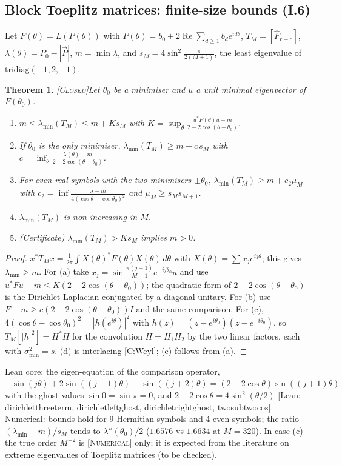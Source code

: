 \documentclass[11pt]{amsart}
\theoremstyle{plain}
\newtheorem{theorem}{Theorem}[section]
\theoremstyle{definition}
\newcommand{\status}[1]{\textsc{[#1]}}
\newcommand{\leanus}{\textunderscore\allowbreak}
\newcommand{\lean}[1]{{\ttfamily\let\_\leanus #1}}
\begin{document}
\subsection{Block Toeplitz matrices: finite-size bounds (I.6)}
Let $F(\theta)=L(P(\theta))$ with $P(\theta)=b_0+2\operatorname{Re}\sum_{d\ge1}b_de^{id\theta}$,
$T_M=[\hat F_{r-c}]$, $\lambda(\theta)=P_0-|\vec P|$, $m=\min\lambda$, and
$s_M=4\sin^2\frac{\pi}{2(M+1)}$, the least eigenvalue of
$\mathrm{tridiag}(-1,2,-1)$.
\begin{theorem}\status{Closed}\label{thm:toeplitz}
Let $\theta_0$ be a minimiser and $u$ a unit minimal eigenvector of $F(\theta_0)$.
\begin{enumerate}[label=(\alph*)]
\item $m\le\lambda_{\min}(T_M)\le m+K s_M$ with
$K=\sup_\theta\frac{u^*F(\theta)u-m}{2-2\cos(\theta-\theta_0)}$.
\item If $\theta_0$ is the only minimiser, $\lambda_{\min}(T_M)\ge m+c\,s_M$ with
$c=\inf_\theta\frac{\lambda(\theta)-m}{2-2\cos(\theta-\theta_0)}$.
\item For even real symbols with the two minimisers $\pm\theta_0$,
$\lambda_{\min}(T_M)\ge m+c_2\mu_M$ with $c_2=\inf\frac{\lambda-m}{4(\cos\theta-\cos\theta_0)^2}$
and $\mu_M\ge s_Ms_{M+1}$.
\item $\lambda_{\min}(T_M)$ is non-increasing in $M$.
\item (Certificate) $\lambda_{\min}(T_M)>Ks_M$ implies $m>0$.
\end{enumerate}
\end{theorem}
\begin{proof}
$x^*T_Mx=\frac1{2\pi}\int X(\theta)^*F(\theta)X(\theta)\,d\theta$ with
$X(\theta)=\sum x_je^{ij\theta}$; this gives $\lambda_{\min}\ge m$. For (a) take
$x_j=\sin\frac{\pi(j+1)}{M+1}e^{-ij\theta_0}u$ and use
$u^*Fu-m\le K(2-2\cos(\theta-\theta_0))$; the quadratic form of
$2-2\cos(\theta-\theta_0)$ is the Dirichlet Laplacian conjugated by a diagonal
unitary. For (b) use $F-m\ge c(2-2\cos(\theta-\theta_0))I$ and the same
comparison. For (c), $4(\cos\theta-\cos\theta_0)^2=|h(e^{i\theta})|^2$ with
$h(z)=(z-e^{i\theta_0})(z-e^{-i\theta_0})$, so $T_M[|h|^2]=H^*H$ for the
convolution $H=H_1H_2$ by the two linear factors, each with
$\sigma_{\min}^2=s$. (d) is interlacing \ref{C:Weyl}; (e) follows from (a).
\end{proof}
\noindent Lean core: the eigen-equation of the comparison operator,
$-\sin(j\theta)+2\sin((j+1)\theta)-\sin((j+2)\theta)=(2-2\cos\theta)\sin((j+1)\theta)$
with the ghost values $\sin 0=\sin\pi=0$, and $2-2\cos\theta=4\sin^2(\theta/2)$
\lean{[Lean: dirichlet\_three\_term, dirichlet\_left\_ghost, dirichlet\_right\_ghost, two\_sub\_two\_cos]}.
Numerical: bounds hold for 9 Hermitian symbols and 4 even symbols; the ratio
$(\lambda_{\min}-m)/s_M$ tends to $\lambda''(\theta_0)/2$ ($1.6576$ vs $1.6634$ at
$M=320$). In case (c) the true order $M^{-2}$ is \status{Numerical} only; it is
expected from the literature on extreme eigenvalues of Toeplitz matrices
\cite{SerraCapizzano,BottcherGrudsky} (to be checked).
\end{document}
